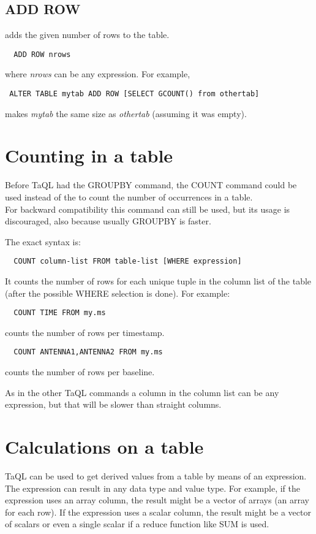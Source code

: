 \subsection{ADD ROW}
adds the given number of rows to the table.
\begin{verbatim}
  ADD ROW nrows
\end{verbatim}
where {\em nrows} can be any expression.
For example,
\begin{verbatim}
 ALTER TABLE mytab ADD ROW [SELECT GCOUNT() from othertab]
\end{verbatim}
makes {\em mytab} the same size as {\em othertab} (assuming it was empty).


\section{\label{TAQL:COUNTING}Counting in a table}
Before TaQL had the GROUPBY command, the COUNT command could be used
instead of the  
to count the number of occurrences in a table.
\\For backward compatibility this command can still be used, but its
usage is discouraged, also because usually GROUPBY is faster.

The exact syntax is:
\begin{verbatim}
  COUNT column-list FROM table-list [WHERE expression]
\end{verbatim}
It counts the number of rows for each unique tuple in the column list
of the table (after the possible WHERE selection is done).
For example:
\begin{verbatim}
  COUNT TIME FROM my.ms
\end{verbatim}
counts the number of rows per timestamp.
\begin{verbatim}
  COUNT ANTENNA1,ANTENNA2 FROM my.ms
\end{verbatim}
counts the number of rows per baseline.

As in the other TaQL commands a column in the column list can be any
expression, but that will be slower than straight columns.

\section{\label{TAQL:CALCULATING}Calculations on a table}
TaQL can be used to get derived values from a table by means of an
expression. The expression can result in any data type and value type.
For example, if the expression uses an array column, the result might
be a vector of arrays (an array for each row). If the expression uses
a scalar column, the result might be a vector of scalars or even a
single scalar if a reduce function like SUM is used.

